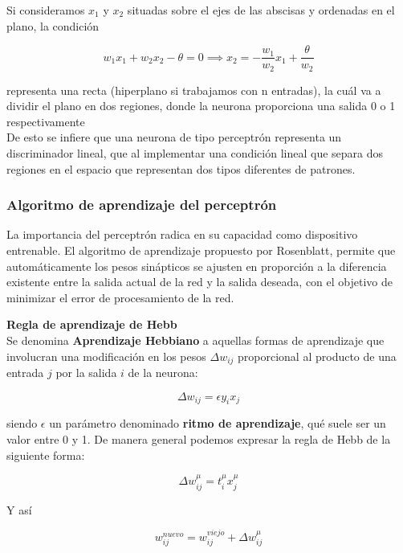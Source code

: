 Si consideramos $x_1$ y $x_2$ situadas sobre el ejes de las abscisas y
ordenadas en el plano, la condición

\begin{equation}
  w_1x_1 + w_2x_2 - \theta = 0 \implies x_2 = -\frac{w_1}{w_2}x_1 + \frac{\theta}{w_2}
\end{equation}

representa una recta (hiperplano si trabajamos con n entradas), la
cuál va a dividir el plano en dos regiones, donde la neurona
proporciona una salida 0 o 1 respectivamente\cite{martin2002redes}\\

De esto se infiere que una neurona de tipo perceptrón representa un
discriminador lineal, que al implementar una condición lineal que
separa dos regiones en el espacio que representan dos tipos diferentes
de patrones.

\subsubsection{Algoritmo de aprendizaje del perceptrón}

La importancia del perceptrón radica en su capacidad como dispositivo
entrenable. El algoritmo de aprendizaje propuesto por Rosenblatt,
permite que automáticamente los pesos sinápticos se ajusten en
proporción a la diferencia existente entre la salida actual de la red
y la salida deseada, con el objetivo de minimizar el error de
procesamiento de la red.\\

\theoremstyle{definition}
\begin{definition}
  \textbf{Regla de aprendizaje de Hebb}\\
  Se denomina \textbf{Aprendizaje Hebbiano} a aquellas formas de
  aprendizaje que involucran una modificación en los pesos $\Delta
  w_{ij}$ proporcional al producto de una entrada $j$ por la salida $i$
  de la neurona:

  \begin{equation}
    \Delta w_{ij}=\epsilon y_ix_j
  \end{equation}

  siendo $\epsilon$ un parámetro denominado \textbf{ritmo de
  aprendizaje}, qué suele ser un valor entre 0 y 1. De manera general
  podemos expresar la regla de Hebb de la siguiente forma:

  \begin{equation}
    \Delta w_{ij}^\mu = t_i^{\mu}x_j^{\mu}
  \end{equation}

  Y así

  \begin{equation}
    w_{ij}^{nuevo} = w_{ij}^{viejo} + \Delta w_{ij}^{\mu}
  \end{equation}

\end{definition}

